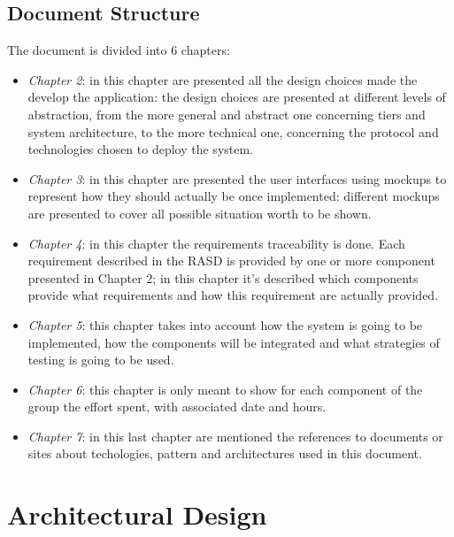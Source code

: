 \documentclass[a4paper]{report}
\begin{document}
\section{Document Structure}
The document is divided into 6 chapters:
\begin{itemize}
\item \textit{Chapter 2}: in this chapter are presented all the design choices made the develop the application: the design choices are presented at different levels of abstraction, from the more general and abstract one concerning tiers and system architecture, to the more technical one, concerning the protocol and technologies chosen to deploy the system.
\item \textit{Chapter 3}: in this chapter are presented the user interfaces using mockups to represent how they should actually be once implemented: different mockups are presented to cover all possible situation worth to be shown.
\item \textit{Chapter 4}: in this chapter the requirements traceability is done. Each requirement described in the RASD is provided by one or more component presented in Chapter 2; in this chapter it's described which components provide what requirements and how this requirement are actually provided.
\item \textit{Chapter 5}: this chapter takes into account how the system is going to be implemented, how the components will be integrated and what strategies of testing is going to be used.
\item \textit{Chapter 6}: this chapter is only meant to show for each component of the group the effort spent, with associated date and hours.
\item \textit{Chapter 7}: in this last chapter are mentioned the references to documents or sites about techologies, pattern and architectures used in this document.

\end{itemize}
\chapter{Architectural Design}
\end{document}
